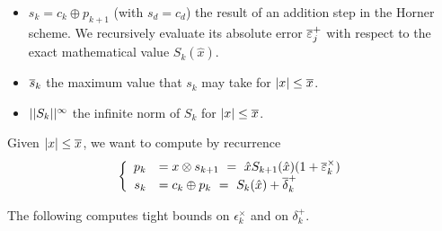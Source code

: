 \begin{itemize}
\item $s_k = c_k \oplus p_{k+1}$ (with $s_d = c_d$)  the result of
  an addition step in the Horner scheme. We recursively evaluate its absolute
  error ${\overline{\varepsilon}}^+_j$ with respect to the exact mathematical value $S_k(\hat{x})$.

\item $\overline{s}_{k}$ the  maximum value that $s_k$ may take for $|x|
  \le {\overline{x}}$.

\item $||{S_k}||^{\infty}$ the infinite norm of $S_k$ for $|x| \leq {\overline{x}}$.

\end{itemize}

Given $ |x| \leq {\overline{x}}$, we want to compute by recurrence
  $$ \left\{
    \begin{array}{rl}
      p_{k}  &= x \otimes s_{k+1}
             \ = \ \hat{x}S_{k+1}(\hat{x}) (1+{\overline{\varepsilon}}^\times_k)\\
      s_{k}  &=  c_k \oplus p_k
             \ = \ S_{k}(\hat{x}) + {\overline{\delta}}^+_k\\
      \end{array}
  \right.
  $$


The following computes tight bounds on $\epsilon^\times_k$ and on $\delta^+_k$.

